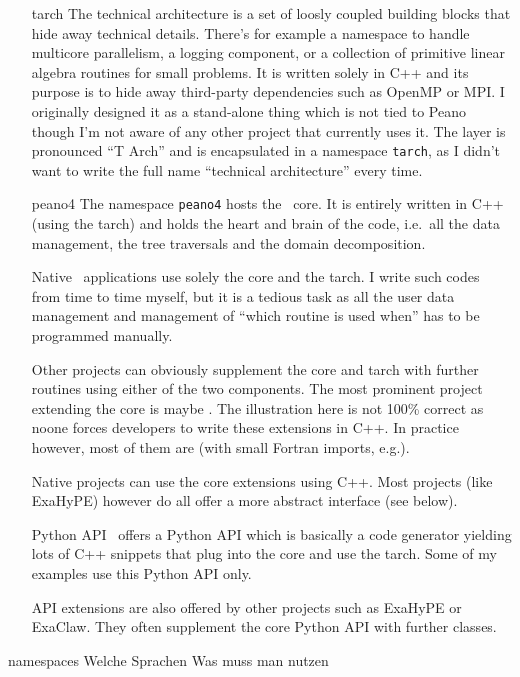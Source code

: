 \begin{itemize}
  \item[tarch] The technical architecture is a set of loosly coupled building
  blocks that hide away technical details. There's for example a namespace to
  handle multicore parallelism, a logging component, or a collection of
  primitive linear algebra routines for small problems. It is written solely in
  C++ and its purpose is to hide away third-party dependencies such as OpenMP
  or MPI. I originally designed it as a stand-alone thing which is not tied to
  Peano though I'm not aware of any other project that currently uses it. The
  layer is pronounced ``T Arch'' and is encapsulated in a namespace
  \texttt{tarch}, as I didn't want to write the full name ``technical
  architecture'' every time.
  \item[peano4] The namespace \texttt{peano4} hosts the \Peano\ core. It is
  entirely written in C++ (using the tarch) and holds the heart and brain of the
  code, i.e.~all the data management, the tree traversals and the domain
  decomposition.
  \item[Native] \Peano\ applications use solely the core and the tarch. I write
  such codes from time to time myself, but it is a tedious task as all the user
  data management and management of ``which routine is used when'' has to be
  programmed manually.
  \item[Other projects] can obviously supplement the core and tarch with further
  routines using either of the two components. The most prominent project
  extending the core is maybe \ExaHyPE. The illustration here is not 100\%
  correct as noone forces developers to write these extensions in C++. In
  practice however, most of them are (with small Fortran imports, e.g.). 
  \item[Native projects] can use the core extensions using C++. Most projects
  (like ExaHyPE) however do all offer a more abstract interface (see below).
  \item[Python API] \Peano\ offers a Python API which is basically a code
  generator yielding lots of C++ snippets that plug into the core and use the
  tarch. Some of my examples use this Python API only.
  \item[API extensions] are also offered by other projects such as ExaHyPE or
  ExaClaw. They often supplement the core Python API with further classes.
\end{itemize}


 namespaces
Welche Sprachen
Was muss man nutzen
